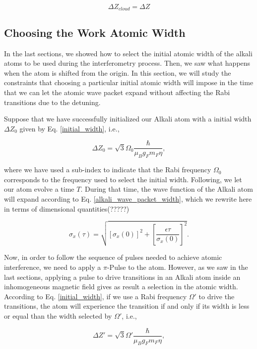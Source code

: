 \documentclass{article}
\begin{document}
\begin{equation}
    \Delta Z_{cloud} = \Delta Z
\end{equation}

\subsection{Choosing the Work Atomic Width}
In the last sections, we showed how to select the initial atomic width of the alkali atoms to be used during the interferometry process. Then, we saw what happens when the atom is shifted from the origin. In this section, we will study the constraints that choosing a particular initial atomic width will impose in the time that we can let the atomic wave packet expand without affecting the Rabi transitions due to the detuning.

Suppose that we have successfully initialized our Alkali atom with a initial width $\Delta Z_{0}$ given by Eq. \ref{initial_width}, i.e.,

\begin{equation}
\Delta Z_{0} = \sqrt{3} \Omega_{0} \frac{\hbar}{\mu_{B} g_{F} m_{F} \eta},
\end{equation}

where we have used a sub-index to indicate that the Rabi frequency $\Omega_{0}$ corresponds to the frequency used to select the initial width. Following, we let our atom evolve a time $T$. During that time, the wave function of the Alkali atom will expand according to Eq. \ref{alkali_wave_packet_width}, which we rewrite here in terms of dimensional quantities(?????)

\begin{equation}
\sigma_{x}(\tau) = \sqrt{[\sigma_{x}(0)]^{2} + \left[\frac{\epsilon \tau}{\sigma_{x}(0)} \right]^{2}}.
\end{equation}

Now, in order to follow the sequence of pulses needed to achieve atomic interference, we need to apply a $\pi$-Pulse to the atom. However, as we saw in the last sections, applying a pulse to drive transitions in an Alkali atom inside an inhomogeneous magnetic field gives as result a selection in the atomic width. According to Eq. \ref{initial_width}, if we use a Rabi frequency $\Omega'$ to drive the transitions, the atom will experience the transition if and only if its width is less or equal than the width selected by $\Omega'$, i.e.,

\begin{equation}
    \Delta Z' = \sqrt{3} \Omega' \frac{\hbar}{\mu_{B} g_{F} m_{F} \eta},
\end{equation}
\end{document}
